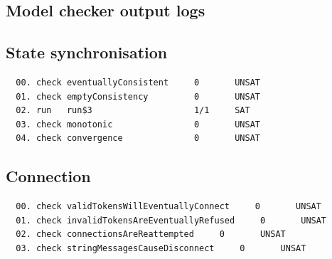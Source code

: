 \documentclass[a4paper, final]{report}
\begin{document}
\begin{appendices}
	\section{Model checker output logs}

	\subsection{State synchronisation}
	\begin{lstlisting}
  00. check eventuallyConsistent     0       UNSAT
  01. check emptyConsistency         0       UNSAT
  02. run   run$3                    1/1     SAT
  03. check monotonic                0       UNSAT
  04. check convergence              0       UNSAT
  \end{lstlisting}

	\subsection{Connection}
	\begin{lstlisting}
  00. check validTokensWillEventuallyConnect     0       UNSAT
  01. check invalidTokensAreEventuallyRefused     0       UNSAT
  02. check connectionsAreReattempted     0       UNSAT
  03. check stringMessagesCauseDisconnect     0       UNSAT
  \end{lstlisting}

\end{appendices}
\end{document}

